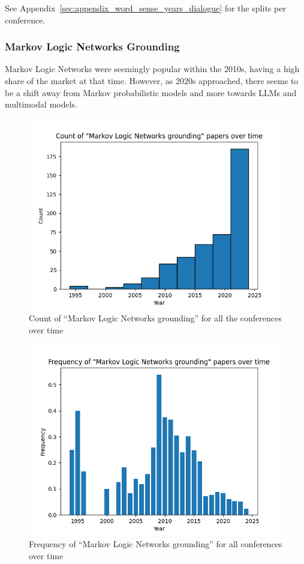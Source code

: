 \documentclass[11pt]{article}
\begin{document}
See Appendix~\ref{sec:appendix_word_sense_years_dialogue} for the splits per conference.

\subsubsection{Markov Logic Networks Grounding}
Markov Logic Networks were seemingly popular within the 2010s, having a high share of the market at that time. However, as 2020s approached, there seems to be a shift away from Markov probabilistic models and more towards LLMs and multimodal models.

\begin{figure}[h!]
  \includegraphics[width=\columnwidth]{figs/grounding_figs/Markov Logic Networks/all_confs_grounding_Markov Logic Networks.png}
  \caption{Count of ``Markov Logic Networks grounding'' for all the conferences over time}
  \label{fig:markov_all_confs_count}
\end{figure}

\begin{figure}[h!]
  \includegraphics[width=\columnwidth]{figs/freq_grounding_figs/Markov Logic Networks/all_confs_grounding_Markov Logic Networks.png}
  \caption{Frequency of ``Markov Logic Networks grounding'' for all conferences over time}
  \label{fig:markov_all_confs_freq}
\end{figure}
\end{document}
